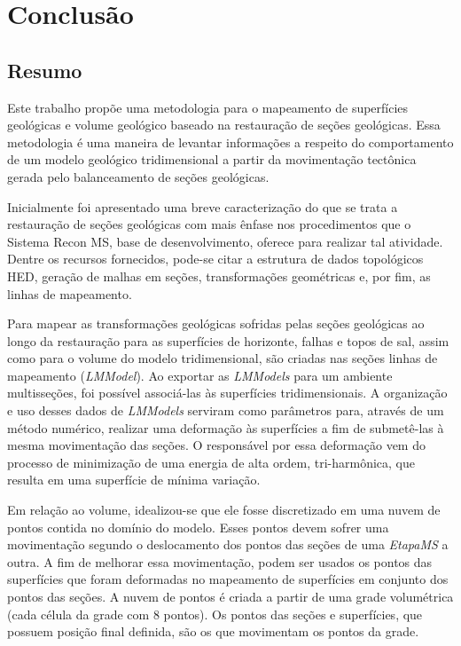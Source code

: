 
\chapter{Conclusão}

\section{Resumo}

Este trabalho propõe uma metodologia para o mapeamento de superfícies geológicas e volume geológico baseado na restauração de seções geológicas. Essa metodologia é uma maneira de levantar informações a respeito do comportamento de um modelo geológico tridimensional a partir da movimentação tectônica gerada pelo balanceamento de seções geológicas.

Inicialmente foi apresentado uma breve caracterização do que se trata a restauração de seções geológicas com mais ênfase nos procedimentos que o Sistema Recon MS, base de desenvolvimento, oferece para realizar tal atividade. Dentre os recursos fornecidos, pode-se citar a estrutura de dados topológicos HED, geração de malhas em seções, transformações geométricas e, por fim, as linhas de mapeamento.

Para mapear as transformações geológicas sofridas pelas seções geológicas ao longo da restauração para as superfícies de horizonte, falhas e topos de sal, assim como para o volume do modelo tridimensional, são criadas nas seções linhas de mapeamento (\emph{LMModel}). Ao exportar as \emph{LMModels} para um ambiente multisseções, foi possível associá-las às superfícies tridimensionais. A organização e uso desses dados de \emph{LMModels} serviram como parâmetros para, através de um método numérico, realizar uma deformação às superfícies a fim de submetê-las à mesma movimentação das seções. O responsável por essa deformação vem do processo de minimização de uma energia de alta ordem, tri-harmônica, que resulta em uma superfície de mínima variação.

Em relação ao volume, idealizou-se que ele fosse discretizado em uma nuvem de pontos contida no domínio do modelo. Esses pontos devem sofrer uma movimentação segundo o deslocamento dos pontos das seções de uma \emph{EtapaMS} a outra. A fim de melhorar essa movimentação, podem ser usados os pontos das superfícies que foram deformadas no mapeamento de superfícies em conjunto dos pontos das seções. A nuvem de pontos é criada a partir de uma grade volumétrica (cada célula da grade com 8 pontos). Os pontos das seções e superfícies, que possuem posição final definida, são os que movimentam os pontos da grade. 


